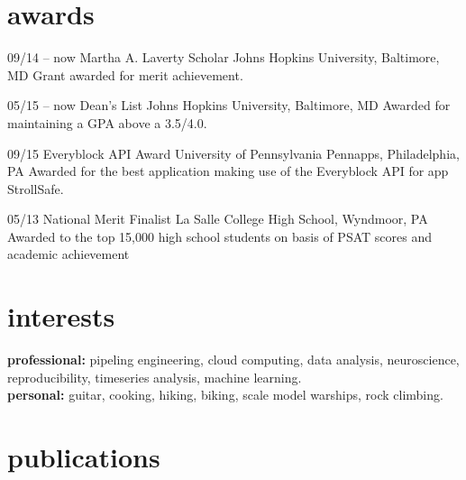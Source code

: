 \documentclass[]{friggeri-cv} %
\begin{document}
\newpage

\section{awards}

\begin{entrylist}
\entry
{09/14 -- now}
{Martha A. Laverty Scholar}
{Johns Hopkins University, Baltimore, MD}
{Grant awarded for merit achievement.}

\entry
{05/15 -- now}
{Dean's List}
{Johns Hopkins University, Baltimore, MD}
{Awarded for maintaining a GPA above a 3.5/4.0.}


\entry
{09/15}
{Everyblock API Award}
{University of Pennsylvania Pennapps, Philadelphia, PA}
{Awarded for the best application making use of the Everyblock API for app StrollSafe.}

\entry
{05/13}
{National Merit Finalist}
{La Salle College High School, Wyndmoor, PA}
{Awarded to the top 15,000 high school students on basis of PSAT scores and academic achievement}

\end{entrylist}


\section{interests}

\textbf{professional:} pipeling engineering, cloud computing, data analysis, neuroscience, reproducibility, timeseries analysis, machine learning.\\
\textbf{personal:} guitar, cooking, hiking, biking, scale model warships, rock climbing.


\section{publications}
\end{document}
